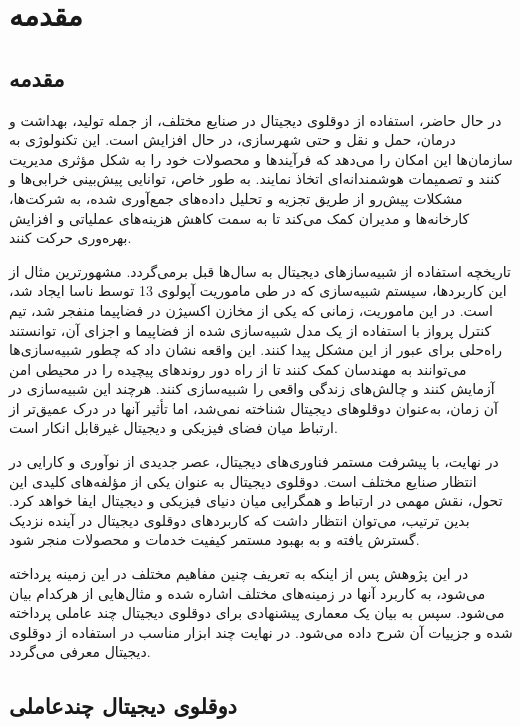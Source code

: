 \chapter{مقدمه}

\section{مقدمه}

در حال حاضر، استفاده از دوقلوی دیجیتال در صنایع مختلف، از جمله تولید، بهداشت و درمان، حمل و نقل و حتی شهرسازی، در حال افزایش است. این تکنولوژی به سازمان‌ها این امکان را می‌دهد که فرآیندها و محصولات خود را به شکل مؤثری مدیریت کنند و تصمیمات هوشمندانه‌ای اتخاذ نمایند. به طور خاص، توانایی پیش‌بینی خرابی‌ها و مشکلات پیش‌رو از طریق تجزیه و تحلیل داده‌های جمع‌آوری شده، به شرکت‌ها، کارخانه‌ها و مدیران کمک می‌کند تا به سمت کاهش هزینه‌های عملیاتی و افزایش بهره‌وری حرکت کنند.


تاریخچه استفاده از شبیه‌ساز‌های دیجیتال به سال‌ها قبل برمی‌گردد. مشهورترین مثال از این کاربردها، سیستم شبیه‌سازی که در طی ماموریت آپولوی 13 توسط ناسا ایجاد شد، است. در این ماموریت، زمانی که یکی از مخازن اکسیژن در فضاپیما منفجر شد، تیم کنترل پرواز با استفاده از یک مدل شبیه‌سازی شده از فضاپیما و اجزای آن، توانستند راه‌حلی برای عبور از این مشکل پیدا کنند. این واقعه نشان داد که چطور شبیه‌سازی‌ها می‌توانند به مهندسان کمک کنند تا از راه دور روندهای پیچیده را در محیطی امن آزمایش کنند و چالش‌های زندگی واقعی را شبیه‌سازی کنند. هرچند این شبیه‌سازی در آن زمان، به‌عنوان دوقلوهای دیجیتال شناخته نمی‌شد، اما تأثیر آنها در درک عمیق‌تر از ارتباط میان فضای فیزیکی و دیجیتال غیرقابل انکار است.
\cite{b3}

در نهایت، با پیشرفت مستمر فناوری‌های دیجیتال، عصر جدیدی از نوآوری و کارایی در انتظار صنایع مختلف است. دوقلوی دیجیتال به عنوان یکی از مؤلفه‌های کلیدی این تحول، نقش مهمی در ارتباط و همگرایی میان دنیای فیزیکی و دیجیتال ایفا خواهد کرد. بدین ترتیب، می‌توان انتظار داشت که کاربردهای دوقلوی دیجیتال در آینده نزدیک گسترش یافته و به بهبود مستمر کیفیت خدمات و محصولات منجر شود.

در این پژوهش پس از اینکه به تعریف چنین مفاهیم مختلف در این زمینه پرداخته می‌شود، به کاربرد آنها در زمینه‌های مختلف اشاره شده و مثال‌هایی از هرکدام بیان می‌شود. سپس به بیان یک معماری پیشنهادی برای دوقلوی دیجیتال چند عاملی پرداخته شده و جزییات آن شرح داده می‌شود. در نهایت چند ابزار مناسب در استفاده از دوقلوی دیجیتال معرفی می‌گردد.




\section{دوقلوی دیجیتال چندعاملی}

